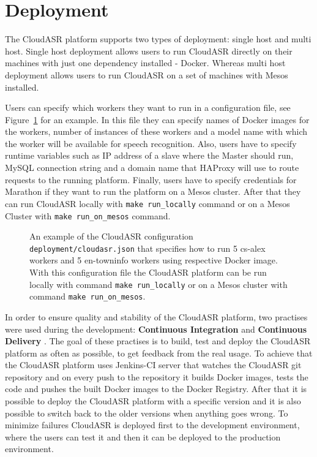 \section{Deployment}
The CloudASR platform supports two types of deployment: single host and multi host.
Single host deployment allows users to run CloudASR directly on their machines with just one dependency installed - Docker.
Whereas multi host deployment allows users to run CloudASR on a set of machines with Mesos installed.

Users can specify which workers they want to run in a configuration file,
  see Figure~\ref{fig:cloudasr-json} for an example.
In this file they can specify names of Docker images for the workers,
  number of instances of these workers
  and a model name with which the worker will be available for speech recognition.
Also, users have to specify runtime variables such as IP address of a slave where the Master should run,
  MySQL connection string and
  a domain name that HAProxy will use to route requests to the running platform.
Finally, users have to specify credentials for Marathon if they want to run the platform on a Mesos cluster.
After that they can run CloudASR locally with \texttt{make run\_locally} command
  or on a Mesos Cluster with \texttt{make run\_on\_mesos} command.

\begin{figure}[h]
  

  \caption{
     An example of the CloudASR configuration \texttt{deployment/cloudasr.json}
       that specifies how to run 5 cs-alex workers and 5 en-towninfo workers
       using respective Docker image.
     With this configuration file the CloudASR platform can be run locally with command \texttt{make run\_locally}
       or on a Mesos cluster with command \texttt{make run\_on\_mesos}.
  }
  \label{fig:cloudasr-json}
\end{figure}


In order to ensure quality and stability of the CloudASR platform,
  two practises were used during the development:
  \textbf{Continuous Integration} \cite{fowler2006continuous} and \textbf{Continuous Delivery} \cite{humble2010continuous}.
The goal of these practises is to build, test and deploy the CloudASR platform as often as possible,
  to get feedback from the real usage.
To achieve that the CloudASR platform uses Jenkins-CI server
  that watches the CloudASR git repository
  and on every push to the repository it builds Docker images,
  tests the code
  and pushes the built Docker images to the Docker Registry.
After that it is possible to deploy the CloudASR platform with a specific version
  and it is also possible to switch back to the older versions when anything goes wrong.
To minimize failures CloudASR is deployed first to the development environment,
  where the users can test it
  and then it can be deployed to the production environment.


